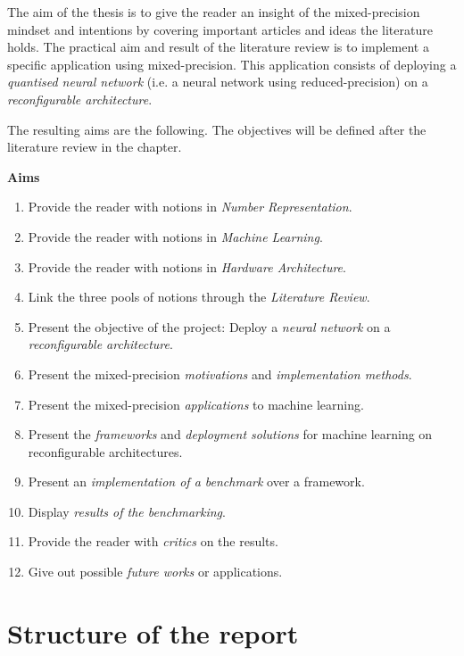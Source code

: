 The aim of the thesis is to give the reader an insight of the mixed-precision mindset and intentions by covering important articles and ideas the literature holds. The practical aim and result of the literature review is to implement a specific application using mixed-precision. This application consists of deploying a \emph{quantised neural network} (i.e. a neural network using reduced-precision) on a \emph{reconfigurable architecture}.

The resulting aims are the following. The objectives will be defined after the literature review in the  chapter.

\textbf{Aims}
\begin{enumerate}
  \item Provide the reader with notions in \emph{Number Representation}.
  \item Provide the reader with notions in \emph{Machine Learning}.
  \item Provide the reader with notions in \emph{Hardware Architecture}.
  \item Link the three pools of notions through the \emph{Literature Review}.
  \item Present the objective of the project: Deploy a \emph{neural network} on a \emph{reconfigurable architecture}.
  \item Present the mixed-precision \emph{motivations} and \emph{implementation methods}.
  \item Present the mixed-precision \emph{applications} to machine learning.
  \item Present the \emph{frameworks} and \emph{deployment solutions} for machine learning on reconfigurable architectures.
  \item Present an \emph{implementation of a benchmark} over a framework.
  \item Display \emph{results of the benchmarking}.
  \item Provide the reader with \emph{critics} on the results.
  \item Give out possible \emph{future works} or applications.
\end{enumerate}


\section{Structure of the report}

